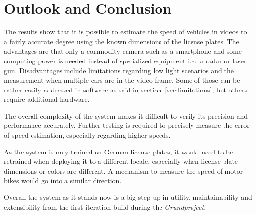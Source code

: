 
\chapter{Outlook and Conclusion} \label{ch:outlook}

The results show that it is possible to estimate the speed of vehicles in videos to a fairly accurate degree using the known dimensions of the license plates.
The advantages are that only a commodity camera such as a smartphone and some computing power is needed instead of specialized equipment i.e.\ a radar or laser gun.
Disadvantages include limitations regarding low light scenarios and the measurement when multiple cars are in the video frame.
Some of those can be rather easily addressed in software as said in section~\ref{sec:limitations}, but others require additional hardware.

The overall complexity of the system makes it difficult to verify its precision and performance accurately.
Further testing is required to precisely measure the error of speed estimation, especially regarding higher speeds.

As the system is only trained on German license plates, it would need to be retrained when deploying it to a different locale, especially when license plate dimensions or colors are different.
A mechanism to measure the speed of motor-bikes would go into a similar direction.

Overall the system as it stands now is a big step up in utility, maintainability and extensibility from the first iteration build during the \textit{Grundproject}.
